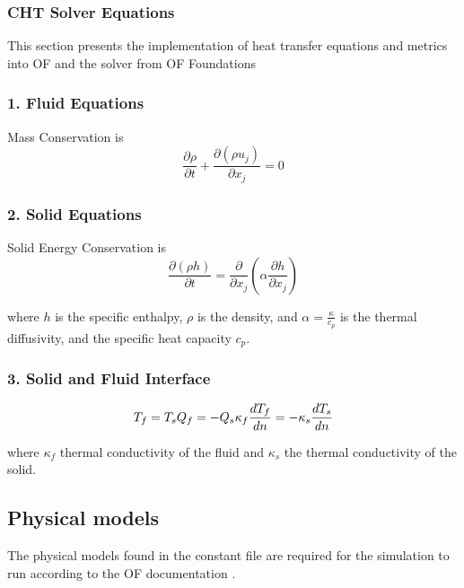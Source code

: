 \subsubsection{CHT Solver Equations}    

This section presents the implementation of heat transfer equations and metrics into  \gls{OF} and the solver from  \gls{OF} Foundations \cite{OpenFOAMFoundation}
\subsubsection{1. Fluid Equations}

Mass Conservation is 
\begin{equation}
\frac{\partial \rho}{\partial t} + \frac{\partial (\rho u_j)}{\partial x_j} = 0
\end{equation}


     

\subsubsection{2. Solid Equations}
Solid Energy Conservation is \begin{equation}
\frac{\partial (\rho h)}{\partial t} = \frac{\partial}{\partial x_j}\left( \alpha \frac{\partial h}{\partial x_j} \right)
\end{equation}

where \( h \) is the specific enthalpy, \( \rho \) is the density, and \( \alpha = \frac{\kappa}{c_p} \) is the thermal diffusivity, and the specific heat capacity \( c_p \). 


\subsubsection{3. Solid and Fluid Interface}
\begin{equation}
T_f = T_s  \\
Q_f = -Q_s  \\
\kappa_f \frac{d T_f}{d n} = -\kappa_s \frac{d T_s}{d n} 
\end{equation}

where \( \kappa_f \) thermal conductivity of the fluid and \( \kappa_s \)  the thermal conductivity of the solid.







\subsection{Physical models}
The physical models found in the constant file are required for the simulation to run according to the  \gls{OF} documentation \cite{OFD}.

